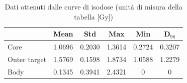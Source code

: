 \documentclass[a4paper,12pt]{article}
\begin{document}
                \begin{table}[H]
                    \centering
                    \begin{tabular}{
                        l | c | c | c | c | c |
                    }
                    \toprule
                    & Mean & Std & Max & Min & D$_{98}$ \\
                    \midrule
                    Core & 1.0696 & 0.2030 & 1.3614 & 0.2724 & 0.3207 \\
                    Outer target & 1.5769 & 0.1598 & 1.8734 & 1.0588 & 1.2279 \\
                    Body & 0.1345 & 0.3941 & 2.4321 & 0 & 0 \\
                    \bottomrule
                    \end{tabular}
                    \caption{Dati ottenuti dalle curve di isodose (unità di misura della tabella [\unit{\gray}])}
                    \label{tab:dati_prima_misura_fotoni}
                \end{table}
\end{document}
